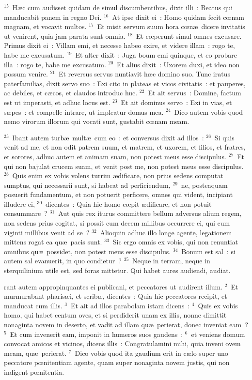 ${}^{15}$~H\ae c cum audisset quidam de simul discumbentibus, dixit illi~: Beatus qui manducabit panem in regno Dei.
${}^{16}$~At ipse dixit ei~: Homo quidam fecit cœnam magnam, et vocavit multos.
${}^{17}$~Et misit servum suum hora cœn\ae\ dicere invitatis ut venirent, quia jam parata sunt omnia.
${}^{18}$~Et cœperunt simul omnes excusare. Primus dixit ei~: Villam emi, et necesse habeo exire, et videre illam~: rogo te, habe me excusatum.
${}^{19}$~Et alter dixit~: Juga boum emi quinque, et eo probare illa~: rogo te, habe me excusatum.
${}^{20}$~Et alius dixit~: Uxorem duxi, et ideo non possum venire.
${}^{21}$~Et reversus servus nuntiavit h\ae c domino suo. Tunc iratus paterfamilias, dixit servo suo~: Exi cito in plateas et vicos civitatis~: et pauperes, ac debiles, et c\ae cos, et claudos introduc huc.
${}^{22}$~Et ait servus~: Domine, factum est ut imperasti, et adhuc locus est.
${}^{23}$~Et ait dominus servo~: Exi in vias, et s\ae pes~: et compelle intrare, ut impleatur domus mea.
${}^{24}$~Dico autem vobis quod nemo virorum illorum qui vocati sunt, gustabit cœnam meam.


${}^{25}$~Ibant autem turb\ae\ mult\ae\ cum eo~: et conversus dixit ad illos~:
${}^{26}$~Si quis venit ad me, et non odit patrem suum, et matrem, et uxorem, et filios, et fratres, et sorores, adhuc autem et animam suam, non potest meus esse discipulus.
${}^{27}$~Et qui non bajulat crucem suam, et venit post me, non potest meus esse discipulus.
${}^{28}$~Quis enim ex vobis volens turrim \ae dificare, non prius sedens computat sumptus, qui necessarii sunt, si habeat ad perficiendum,
${}^{29}$~ne, posteaquam posuerit fundamentum, et non potuerit perficere, omnes qui vident, incipiant illudere ei,
${}^{30}$~dicentes~: Quia hic homo cœpit \ae dificare, et non potuit consummare~?
${}^{31}$~Aut quis rex iturus committere bellum adversus alium regem, non sedens prius cogitat, si possit cum decem millibus occurrere ei, qui cum viginti millibus venit ad se~?
${}^{32}$~Alioquin adhuc illo longe agente, legationem mittens rogat ea qu\ae\ pacis sunt.
${}^{33}$~Sic ergo omnis ex vobis, qui non renuntiat omnibus qu\ae\ possidet, non potest meus esse discipulus.
${}^{34}$~Bonum est sal~: si autem sal evanuerit, in quo condietur~?
${}^{35}$~Neque in terram, neque in sterquilinium utile est, sed foras mittetur. Qui habet aures audiendi, audiat.

\bchapter
{}rant autem appropinquantes ei publicani, et peccatores ut audirent illum.
${}^{2}$~Et murmurabant pharis\ae i, et scrib\ae , dicentes~: Quia hic peccatores recipit, et manducat cum illis.
${}^{3}$~Et ait ad illos parabolam istam dicens~:
${}^{4}$~Quis ex vobis homo, qui habet centum oves, et si perdiderit unam ex illis, nonne dimittit nonaginta novem in deserto, et vadit ad illam qu\ae\ perierat, donec inveniat eam~?
${}^{5}$~Et cum invenerit eam, imponit in humeros suos gaudens~:
${}^{6}$~et veniens domum convocat amicos et vicinos, dicens illis~: Congratulamini mihi, quia inveni ovem meam, qu\ae\ perierat.
${}^{7}$~Dico vobis quod ita gaudium erit in c\ae lo super uno peccatore pœnitentiam agente, quam super nonaginta novem justis, qui non indigent pœnitentia.


